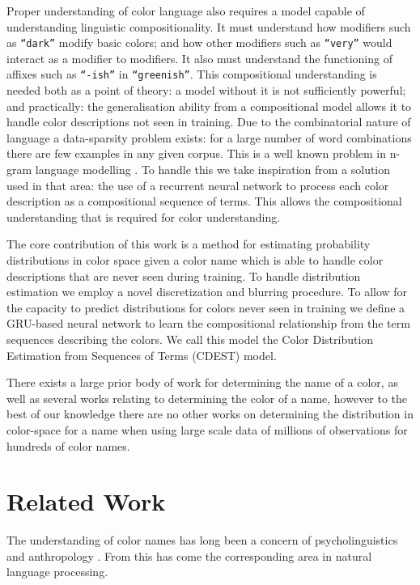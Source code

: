 \documentclass[11pt,letterpaper]{article}
\newcommand{\parencite}{\cite}
\begin{document}
Proper understanding of color language also requires a model capable of understanding linguistic compositionality.
It must understand how modifiers such as \texttt{``dark''} modify basic colors; and  how other modifiers such as \texttt{``very''} would interact as a modifier to modifiers.
It also must understand the functioning of affixes such as \texttt{``-ish''} in \texttt{``greenish''}.
This compositional understanding is needed both as a point of theory: a model without it is not sufficiently powerful; and practically: the generalisation ability from a compositional model allows it to handle color descriptions not seen in training.
Due to the combinatorial nature of language a data-sparsity problem exists:
for a large number of word combinations there are few examples in any given corpus.
This is a well known problem in n-gram language modelling \parencite{kneser1995improved,chen1996empirical,rosenfeld2000two}.
To handle this we take inspiration from a solution used in that area: the use of a recurrent neural network \parencite{mikolov2010recurrent,mikolov2011RnnLM} to process each color description as a compositional sequence of terms.
This allows the compositional understanding that is required for color understanding.


The core contribution of this work is a method for estimating probability distributions in color space given a color name which is able to handle color descriptions that are never seen during training.
To handle distribution estimation we employ a novel discretization and blurring procedure.
To allow for the capacity to predict distributions for colors never seen in training we define a GRU-based neural network to learn the compositional relationship from the term sequences describing the colors.
We call this model the Color Distribution Estimation from Sequences of Terms (CDEST) model.

There exists a large prior body of work for determining the name of a color, as well as several works relating to determining the color of a name, however to the best of our knowledge there are no other works on determining the distribution in color-space for a name when using large scale data of millions of observations for hundreds of color names.

\section{Related Work}\label{sec:related-work}

The understanding of color names has long been a concern of psycholinguistics and anthropology  \parencite{berlin1969basic,heider1972universals,HEIDER1972337,mylonas2015use}.
From this has come the corresponding area in natural language processing.
\end{document}
